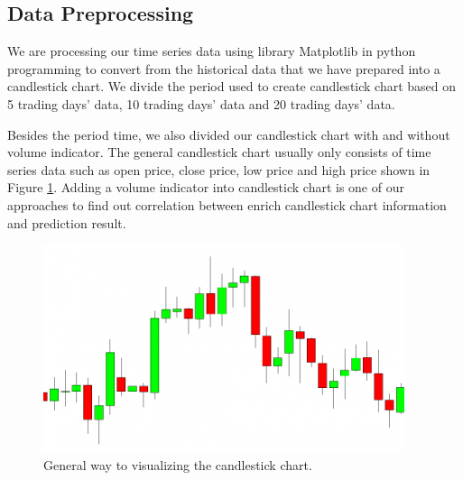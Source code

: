 \documentclass[10pt,twocolumn]{article}
\begin{document}
\subsection{Data Preprocessing}
We are processing our time series data using library Matplotlib \cite{hunter2007matplotlib} in python programming to convert from the historical data that we have prepared into a candlestick chart. We divide the period used to create candlestick chart based on 5 trading days’ data, 10 trading days’ data and 20 trading days’ data. 
\par
Besides the period time, we also divided our candlestick chart with and without volume indicator. The general candlestick chart usually only consists of time series data such as open price, close price, low price and high price shown in Figure \ref{fig:generalcandlestickchart}. Adding a volume indicator into candlestick chart is one of our approaches to find out correlation between enrich candlestick chart information and prediction result.
\begin{figure}
  \includegraphics[width=\linewidth]{figures/generalcandlestickchart.png}
  \caption{General way to visualizing the candlestick chart.}
  \label{fig:generalcandlestickchart}
\end{figure}
\end{document}

